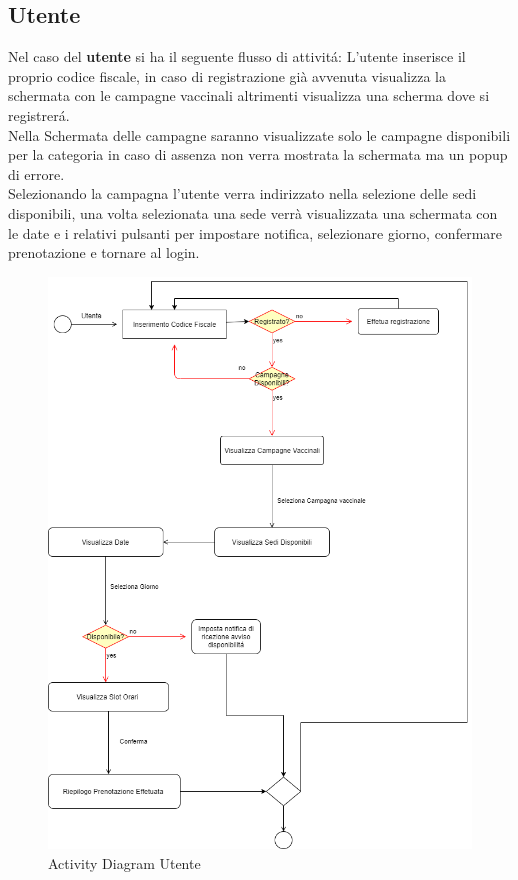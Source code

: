 \documentclass[a4paper,12pt,openany,oneside]{book}
\begin{document}
\subsection{Utente}
Nel caso del \textbf{utente} si ha il seguente flusso di attivitá: L'utente inserisce il proprio codice fiscale, in  caso di registrazione già avvenuta visualizza la schermata con le campagne vaccinali altrimenti visualizza una scherma dove si registrerá.\\Nella Schermata delle campagne saranno visualizzate solo le campagne disponibili per la categoria in caso di assenza non verra mostrata la schermata ma un popup di errore.\\Selezionando la campagna l'utente verra indirizzato nella selezione delle sedi disponibili, una volta selezionata una sede verrà visualizzata una schermata con le date e i relativi pulsanti per impostare notifica, selezionare giorno, confermare prenotazione e tornare al login.
\begin{figure}[h] 
\centering
\includegraphics[width=0.6\columnwidth]{Activity Diagram Utente.png} 
\caption{Activity Diagram Utente} 
\end{figure}
\newpage
\end{document}
